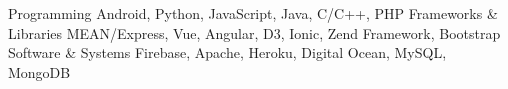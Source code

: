 \begin{cvskills}
  \cvskill
    {Programming}
    {Android, Python, JavaScript, Java, C/C++, PHP}
  \cvskill
  {Frameworks \& Libraries}
  {MEAN/Express, Vue, Angular, D3, Ionic, Zend Framework, Bootstrap}  
  \cvskill
  {Software \& Systems}
  {Firebase, Apache, Heroku, Digital Ocean, MySQL, MongoDB}      
\end{cvskills}
